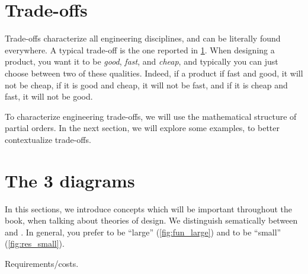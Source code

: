 \section{Trade-offs}

Trade-offs characterize all engineering disciplines, and can be literally found everywhere.
A typical trade-off is the one reported in \cref{fig:fast_good_cheap}.
When designing a product, you want it to be \emph{good}, \emph{fast}, and \emph{cheap}, and typically you can just choose between two of these qualities.
Indeed, if a product if fast and good, it will not be cheap, if it is good and cheap, it will not be fast, and if it is cheap and fast, it will not be good.

\begin{figure}[h!]
  \begin{center}
  \end{center}
  \caption{}
  \label{fig:fast_good_cheap}
\end{figure}

To characterize engineering trade-offs, we will use the mathematical structure of partial orders. In the next section, we will explore some examples, to better contextualize trade-offs.

\section{The 3 diagrams}



In this sections, we introduce concepts which will be important throughout the book, when talking about theories of design.
We distinguish sematically between  and .
In general, you prefer  to be ``large'' (\cref{fig:fun_large}) and  to be ``small'' (\cref{fig:res_small}).

\begin{marginfigure}
  \begin{center}
\end{center}
   \caption{Requirements/costs. \label{fig:res_small}}
\end{marginfigure}

